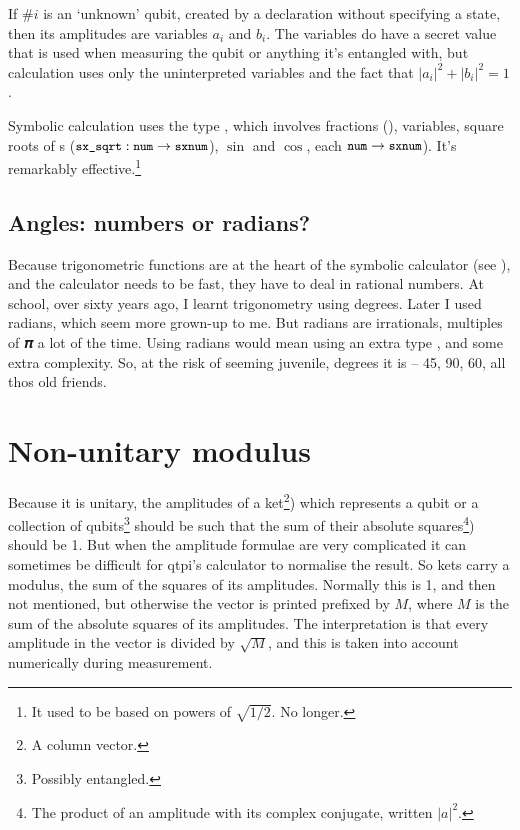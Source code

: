 If $\#i${} is an `unknown' qubit, created by a  declaration without specifying a state, then its amplitudes are variables $a_{i}$ and $b_{i}$. The variables do have a secret value that is used when measuring the qubit or anything it's entangled with, but calculation uses only the uninterpreted variables and the fact that $|a_{i}|^{2}+|b_{i}|^{2}=1$.

Symbolic calculation uses the type , which involves fractions (), variables, square roots of s ($\texttt{\small{}sx\_sqrt}: \texttt{\small{}num}->\texttt{\small{}sxnum}$), $\sin$ and $\cos$, each $\texttt{\small{}num}->\texttt{\small{}sxnum}$). It's remarkably effective.\footnote{It used to be based on powers of $\sqrt{1/2}$. No longer.}

\subsection{Angles: numbers or radians?}

Because trigonometric functions are at the heart of the symbolic calculator (see ), and the calculator needs to be fast, they have to deal in rational numbers. At school, over sixty years ago, I learnt trigonometry using degrees. Later I used radians, which seem more grown-up to me. But radians are irrationals, multiples of 𝝅 a lot of the time. Using radians would mean using an extra type , and some extra complexity. So, at the risk of seeming juvenile, degrees it is -- 45, 90, 60, all thos old friends.

\section{Non-unitary modulus}

Because it is unitary, the amplitudes of a ket\footnote{A column vector.}) which represents a qubit or a collection of qubits\footnote{Possibly entangled.} should be such that the sum of their absolute squares\footnote{The product of an amplitude with its complex conjugate, written $|a|^{2}$.}) should be 1. But when the amplitude formulae are very complicated it can sometimes be difficult for qtpi's calculator to normalise the result. So kets carry a modulus, the sum of the squares of its amplitudes. Normally this is 1, and then not mentioned, but otherwise the vector is printed prefixed by \verbtt{<<}$M$\verbtt{>>}, where $M$ is the sum of the absolute squares of its amplitudes. The interpretation is that every amplitude in the vector is divided by $\sqrt{M}$, and this is taken into account numerically during measurement.

